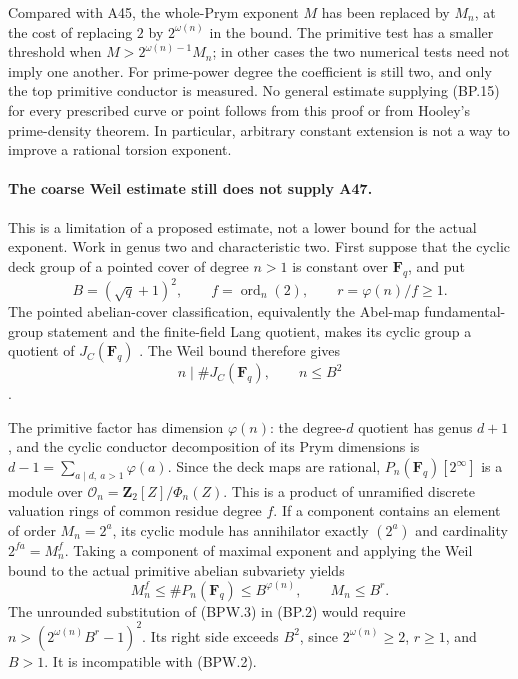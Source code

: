 \documentclass[11pt,a4paper]{article}
\begin{document}
Compared with A45, the whole-Prym exponent $M$ has been replaced
by $M_n$, at the cost of replacing $2$ by $2^{\omega(n)}$ in
the bound. The primitive test has a smaller threshold when
$M>2^{\omega(n)-1}M_n$; in other cases the two numerical tests
need not imply one another. For prime-power degree the coefficient
is still two, and only the top primitive conductor is measured.
No general estimate supplying (BP.15) for every prescribed curve
or point follows from this proof or from Hooley's prime-density
theorem. In particular, arbitrary constant extension is not a
way to improve a rational torsion exponent.


\paragraph{The coarse Weil estimate still does not supply A47.}
This is a limitation of a proposed estimate, not a lower bound
for the actual exponent. Work in genus two and characteristic
two. First suppose that the cyclic deck group of a pointed
cover of degree $n>1$ is constant over $\mathbf F_q$, and put
\[
 B=(\sqrt q+1)^2,\qquad f=\operatorname{ord}_n(2),
                         \qquad r=\varphi(n)/f\ge1.
 \tag{BPW.1}
\]
The pointed abelian-cover classification, equivalently the
Abel-map fundamental-group statement and the finite-field
Lang quotient, makes its cyclic group a quotient of
$J_C(\mathbf F_q)$ \cite[Proposition~9.1]{MilneJV}.
The Weil bound therefore gives
\[
                  n\mid\#J_C(\mathbf F_q),\qquad n\le B^2
 \tag{BPW.2}
\]
\cite[Theorem~19.1]{MilneAV}.

The primitive factor has dimension $\varphi(n)$: the
degree-$d$ quotient has genus $d+1$, and the cyclic conductor
decomposition of its Prym dimensions is
$d-1=\sum_{a\mid d,\ a>1}\varphi(a)$.
Since the deck maps are rational, $P_n(\mathbf F_q)[2^\infty]$
is a module over
$\mathcal O_n=\mathbf Z_2[Z]/\Phi_n(Z)$.
This is a product of unramified discrete valuation rings of
common residue degree $f$. If a component contains an element
of order $M_n=2^a$, its cyclic module has annihilator exactly
$(2^a)$ and cardinality $2^{fa}=M_n^f$.
Taking a component of maximal exponent and applying the Weil
bound to the actual primitive abelian subvariety yields
\[
 M_n^f\le\#P_n(\mathbf F_q)\le B^{\varphi(n)},
                         \qquad M_n\le B^r.
 \tag{BPW.3}
\]
The unrounded substitution of (BPW.3) in (BP.2) would require
$n>(2^{\omega(n)}B^r-1)^2$. Its right side exceeds $B^2$,
since $2^{\omega(n)}\ge2$, $r\ge1$, and $B>1$.
It is incompatible with (BPW.2).
\end{document}
